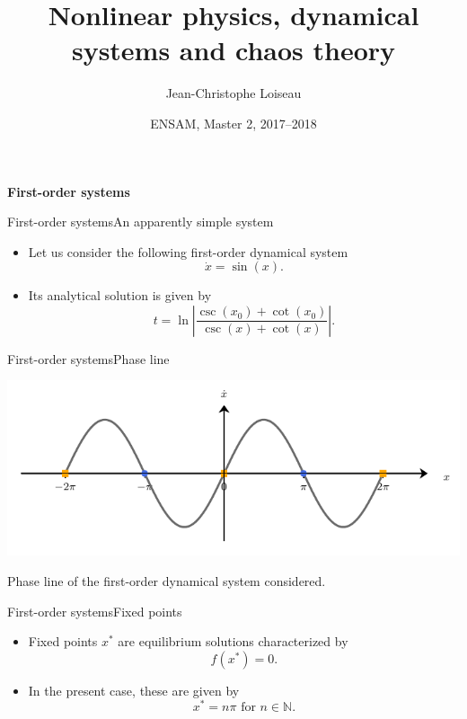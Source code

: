 \documentclass[usenames,dvipsnames,svgnames,10pt,aspectratio=169]{beamer}
\title[Nonlinear Physics] %
{
	Nonlinear physics, dynamical \\ systems and chaos theory
}
\author[J.-Ch.~Loiseau] %
{
	Jean-Christophe Loiseau
}
\institute[unused]
{
	\url{jean-christophe.loiseau@ensam.eu} \\
	DynFluid, \\
	Arts et M\'etiers ParisTech, France
}
\date[unused]{ENSAM, Master 2, 2017--2018}
\begin{document}
\titleframe %


\begin{frame}[t, c]{}
	\centering
	\vspace{1cm}

	{\Large \textbf{First-order systems}}

	\bigskip

	{}

\end{frame}

\begin{frame}[t, c]{First-order systems}{An apparently simple system}
	\begin{itemize}
		\item Let us consider the following first-order dynamical system
		$$
		\dot{x} = \sin(x).
		$$

		\bigskip

		\item Its analytical solution is given by
		$$
		t = \displaystyle \ln \left\vert \frac{\csc(x_0) + \cot(x_0)}{\csc(x) + \cot(x)} \right\vert.
		$$
	\end{itemize}

	\vspace{1cm}
\end{frame}

\begin{frame}[t, c]{First-order systems}{Phase line}
	\centering

	\includegraphics[width=.75\textwidth]{flow_on_the_line}

	\bigskip

	Phase line of the first-order dynamical system considered.

	\vspace{1cm}
\end{frame}

\begin{frame}[t, c]{First-order systems}{Fixed points}
	\begin{itemize}
		\item Fixed points $x^*$ are equilibrium solutions characterized by
		$$
		f(x^*) = 0.
		$$

		\bigskip

		\item In the present case, these are given by
		$$
		x^* = n \pi \text{ for } n \in \mathbb{N}.
		$$
	\end{itemize}

	\vspace{1cm}
\end{frame}
\end{document}
